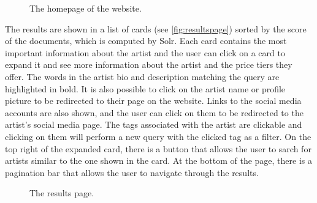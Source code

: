 \documentclass[tikz,14pt]{article}
\begin{document}
\begin{figure}[H]
    \centering
    \caption{The homepage of the website.}
    \label{fig:homepage}
\end{figure}

The results are shown in a list of cards (see \autoref{fig:resultspage}) sorted by the score of the documents, which is computed by Solr.
Each card contains the most important information about the artist and the user can click on a card to expand it 
and see more information about the artist and the price tiers they offer.
The words in the artist bio and description matching the query are highlighted in bold.
It is also possible to click on the artist name or profile picture to be redirected to their page on the website.
Links to the social media accounts are also shown, and the user can click on them to be redirected to the artist's social media page.
The tags associated with the artist are clickable and clicking on them will perform a new query with the clicked tag as a filter.
On the top right of the expanded card, there is a button that allows the user to sarch for artists similar to the one shown in the card.
At the bottom of the page, there is a pagination bar that allows the user to navigate through the results.

\begin{figure}[H]
    \centering
    \caption{The results page.}
    \label{fig:resultspage}
\end{figure}
\end{document}
